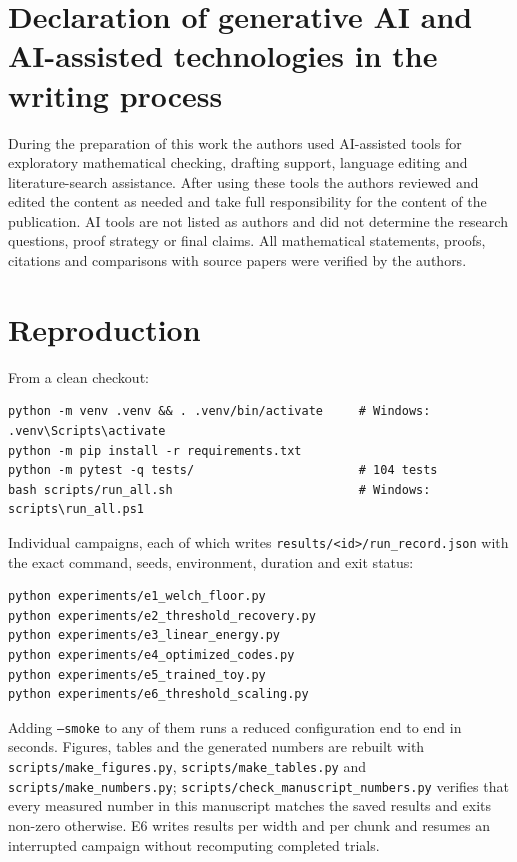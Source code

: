 \documentclass[preprint,12pt]{elsarticle}
\theoremstyle{definition}
\newcommand{\code}[1]{\texttt{\small #1}}
\begin{document}
\section*{Declaration of generative AI and AI-assisted technologies in the writing process}
During the preparation of this work the authors used AI-assisted tools for exploratory
mathematical checking, drafting support, language editing and literature-search assistance.
After using these tools the authors reviewed and edited the content as needed and take full
responsibility for the content of the publication. AI tools are not listed as authors and did
not determine the research questions, proof strategy or final claims. All mathematical
statements, proofs, citations and comparisons with source papers were verified by the authors.




\clearpage
\appendix

\section{Reproduction}
\label{app:repro}

From a clean checkout:

\begin{verbatim}
python -m venv .venv && . .venv/bin/activate     # Windows: .venv\Scripts\activate
python -m pip install -r requirements.txt
python -m pytest -q tests/                       # 104 tests
bash scripts/run_all.sh                          # Windows: scripts\run_all.ps1
\end{verbatim}

Individual campaigns, each of which writes \code{results/<id>/run\_record.json} with the exact
command, seeds, environment, duration and exit status:

\begin{verbatim}
python experiments/e1_welch_floor.py
python experiments/e2_threshold_recovery.py
python experiments/e3_linear_energy.py
python experiments/e4_optimized_codes.py
python experiments/e5_trained_toy.py
python experiments/e6_threshold_scaling.py
\end{verbatim}

Adding \code{--smoke} to any of them runs a reduced configuration end to end in seconds.
Figures, tables and the generated numbers are rebuilt with
\code{scripts/make\_figures.py}, \code{scripts/make\_tables.py} and
\code{scripts/make\_numbers.py}; \code{scripts/check\_manuscript\_numbers.py} verifies that
every measured number in this manuscript matches the saved results and exits non-zero
otherwise. E6 writes results per width and per chunk and resumes an interrupted campaign
without recomputing completed trials.
\end{document}
